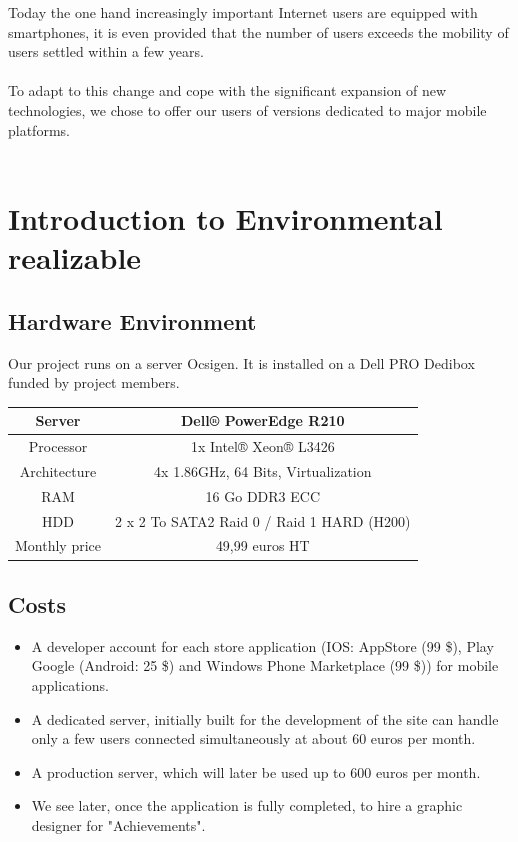 \documentclass{life-fr}
\begin{document}
Today the one hand increasingly important Internet users are equipped with smartphones, it is even provided that the number of users exceeds the mobility of users settled within a few years.\\
\\
To adapt to this change and cope with the significant expansion of new technologies, we chose to offer our users of versions dedicated to major mobile platforms.\\
\\

\newpage
\hspace{2cm}
\newpage


\chapter{Introduction to Environmental realizable}

\section{Hardware Environment}

Our project runs on a server Ocsigen. It is installed on a Dell PRO Dedibox funded by project members.

\vspace{20pt}

\begin{tabular}{|c|c|}
  \hline
   Server & Dell® PowerEdge R210\\
  \hline
  Processor & 1x Intel® Xeon® L3426\\
  \hline
  Architecture & 4x 1.86GHz, 64 Bits, Virtualization\\
  \hline
  RAM & 16 Go DDR3 ECC\\
  \hline
  HDD & 2 x 2 To SATA2 Raid 0 / Raid 1 HARD (H200)\\
  \hline
  Monthly price & 49,99 euros HT\\
  \hline
\end{tabular}

\vspace{20pt}

\section{Costs}

\begin{itemize}
  \item A developer account for each store application (IOS: AppStore (99 \$), Play Google (Android: 25 \$) and Windows Phone Marketplace (99 \$)) for mobile applications.
  \item A dedicated server, initially built for the development of the site can handle only a few users connected simultaneously at about 60 euros per month.
  \item A production server, which will later be used up to 600 euros per month.
  \item We see later, once the application is fully completed, to hire a graphic designer for "Achievements".
\end{itemize}
\end{document}
